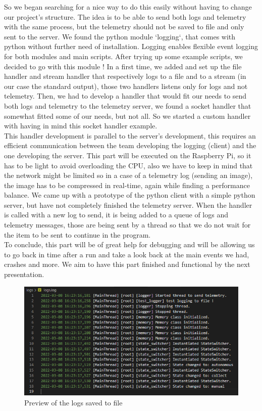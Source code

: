 \documentclass[12pt]{article}
\begin{document}
So we began searching for a nice way to do this easily without having to change our project's structure. The idea is to be able to send both logs and telemetry with the same process, but the telemetry should not be saved to file and only sent to the server. We found the python module `logging`, that comes with python without further need of installation. Logging enables flexible event logging for both modules and main scripts. After trying up some example scripts, we decided to go with this module ! In a first time, we added and set up the file handler and stream handler that respectively logs to a file and to a stream (in our case the standard output), those two handlers listens only for logs and not telemetry. Then, we had to develop a handler that would fit our needs to send both logs and telemetry to the telemetry server, we found a socket handler that somewhat fitted some of our needs, but not all. So we started a custom handler with having in mind this socket handler example. \\

This handler development is parallel to the server's development, this requires an efficient communication between the team developing the logging (client) and the one developing the server. This part will be executed on the Raspberry Pi, so it has to be light to avoid overloading the CPU, also we have to keep in mind that the network might be limited so in a case of a telemetry log (sending an image), the image has to be compressed in real-time, again while finding a performance balance.
We came up with a prototype of the python client with a simple python server, but have not completely finished the telemetry server. When the handler is called with a new log to send, it is being added to a queue of logs and telemetry messages, those are being sent by a thread so that we do not wait for the item to be sent to continue in the program. \\
To conclude, this part will be of great help for debugging and will be allowing us to go back in time after a run and take a look back at the main events we had, crashes and more. We aim to have this part finished and functional by the next presentation.


\begin{figure}[h!]
    \includegraphics[width=\textwidth]{../../docs/logs.png}
    \caption{Preview of the logs saved to file}
    \label{fig:logs}
\end{figure}
\end{document}
